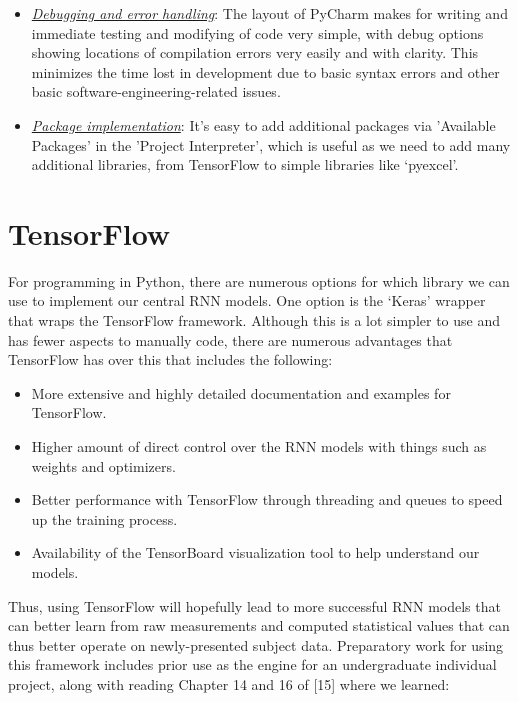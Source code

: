 \documentclass[12pt,twoside]{report}
\begin{document}
\begin{itemize}
	\item \underline{\textit{Debugging and error handling}}: The layout of PyCharm makes for writing and immediate testing and modifying of code very simple, with debug options showing locations of compilation errors very easily and with clarity. This minimizes the time lost in development due to basic syntax errors and other basic software-engineering-related issues.
	\item \underline{\textit{Package implementation}}: It’s easy to add additional packages via 'Available Packages' in the 'Project Interpreter', which is useful as we need to add many additional libraries, from TensorFlow to simple libraries like ‘pyexcel’.
\end{itemize}


\section{TensorFlow}

\quad For programming in Python, there are numerous options for which library we can use to implement our central RNN models. One option is the ‘Keras’ wrapper that wraps the TensorFlow framework. Although this is a lot simpler to use and has fewer aspects to manually code, there are numerous advantages that TensorFlow has over this that includes the following:

\begin{itemize}
	\item More extensive and highly detailed documentation and examples for TensorFlow.
	\item Higher amount of direct control over the RNN models with things such as weights and optimizers.
	\item Better performance with TensorFlow through threading and queues to speed up the training process.
	\item Availability of the TensorBoard visualization tool to help understand our models.
\end{itemize}

\quad Thus, using TensorFlow will hopefully lead to more successful RNN models that can better learn from raw measurements and computed statistical values that can thus better operate on newly-presented subject data. Preparatory work for using this framework includes prior use as the engine for an undergraduate individual project, along with reading Chapter 14 and 16 of [15] where we learned:
\end{document}
